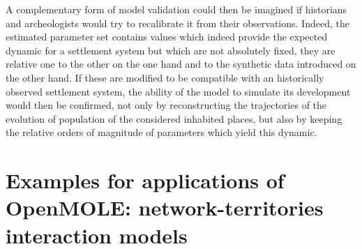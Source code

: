\documentclass[10pt]{article}
\begin{document}
A complementary form of model validation could then be imagined if historians and archeologists would try to recalibrate it from their observations. Indeed, the estimated parameter set contains values which indeed provide the expected dynamic for a settlement system but which are not absolutely fixed, they are relative one to the other on the one hand and to the synthetic data introduced on the other hand. If these are modified to be compatible with an historically observed settlement system, the ability of the model to simulate its development would then be confirmed, not only by reconstructing the trajectories of the evolution of population of the considered inhabited places, but also by keeping the relative orders of magnitude of parameters which yield this dynamic. 




\section{Examples for applications of OpenMOLE: network-territories interaction models}
\end{document}
